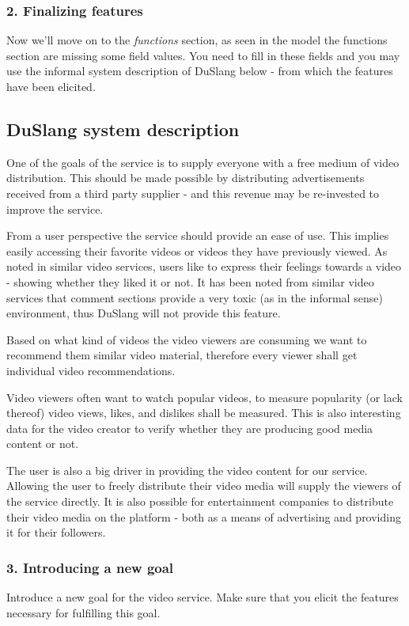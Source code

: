 \documentclass[11pt]{article}
\begin{document}
\subsubsection*{2. Finalizing features}
Now we'll move on to the \textit{functions} section, as seen in the model the functions section are missing some field values. You need to fill in these fields and you may use the informal system description of DuSlang below - from which the features have been elicited.

\begin{framed}
\subsection*{DuSlang system description}
One of the goals of the service is to supply everyone with a free medium of video distribution. This should be made possible by distributing advertisements received from a third party supplier - and this revenue may be re-invested to improve the service.

From a user perspective the service should provide an ease of use. This implies easily accessing their favorite videos or videos they have previously viewed. As noted in similar video services, users like to express their feelings towards a video - showing whether they liked it or not. It has been noted from similar video services that comment sections provide a very toxic (as in the informal sense) environment, thus DuSlang will not provide this feature.

Based on what kind of videos the video viewers are consuming we want to recommend them similar video material, therefore every viewer shall get individual video recommendations.

Video viewers often want to watch popular videos, to measure popularity (or lack thereof) video views, likes, and dislikes shall be measured. This is also interesting data for the video creator to verify whether they are producing good media content or not.

The user is also a big driver in providing the video content for our service. Allowing the user to freely distribute their video media will supply the viewers of the service directly. It is also possible for entertainment companies to distribute their video media on the platform - both as a means of advertising and providing it for their followers.

\end{framed}

\subsubsection*{3. Introducing a new goal}
Introduce a new goal for the video service. Make sure that you elicit the features necessary for fulfilling this goal.
\end{document}
